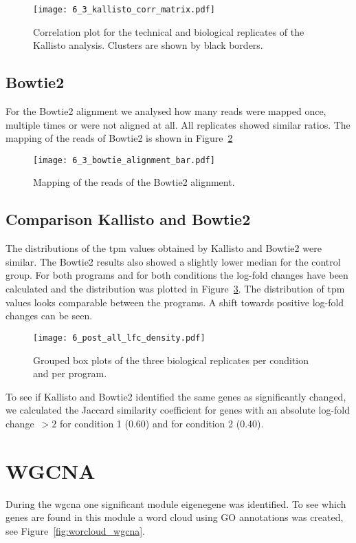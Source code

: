 \begin{figure}[H]
  \center
  \texttt{[image: 6\_3\_kallisto\_corr\_matrix.pdf]}
  \caption{Correlation plot for the technical and biological replicates of the Kallisto
  analysis. Clusters are shown by black borders.}\label{fig:corr_kallisto}
\end{figure}

\subsection{Bowtie2}

For the Bowtie2 alignment we analysed how many reads were mapped once, multiple times or were 
not aligned at all. All replicates showed similar ratios. 
The mapping of the reads of Bowtie2 is shown in Figure~\ref{fig:bar_bowtie}

\begin{figure}[H]
  \center
  \texttt{[image: 6\_3\_bowtie\_alignment\_bar.pdf]}
  \caption{Mapping of the reads of the Bowtie2 alignment.}\label{fig:bar_bowtie}
\end{figure}

\subsection{Comparison Kallisto and Bowtie2}
The distributions of the \gls{tpm} values obtained by Kallisto and Bowtie2 were similar. 
The Bowtie2 results also showed a slightly lower median for the control group.
For both programs and for both conditions the log-fold changes have been calculated 
and the distribution was plotted in Figure~\ref{fig:dist_lfc}.
The distribution of \gls{tpm} values looks comparable between the programs. A shift towards positive 
log-fold changes can be seen. 

\begin{figure}[H]
  \center
  \texttt{[image: 6\_post\_all\_lfc\_density.pdf]}
  \caption{Grouped box plots of the three biological replicates per condition and per program.}\label{fig:dist_lfc}
\end{figure}

To see if Kallisto and Bowtie2 identified the same genes as significantly changed, 
we calculated the Jaccard similarity coefficient for genes with an absolute log-fold 
change~$> 2$ for condition 1 (0.60) and for condition 2 (0.40). 

\pagebreak

\section{WGCNA}
During the \gls{wgcna} one significant module eigenegene
was identified. To see which genes are found in this module a word cloud using GO annotations 
was created, see 
Figure~\ref{fig:worcloud_wgcna}.

